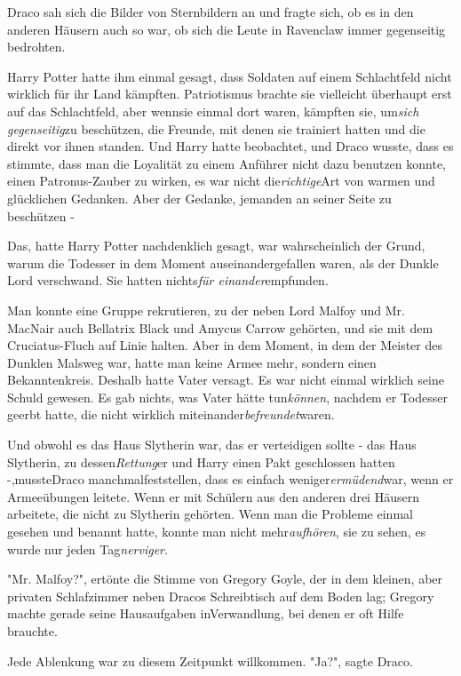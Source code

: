 {Draco sah sich die Bilder von Sternbildern an und fragte sich, ob es in den anderen Häusern auch so war, ob sich die Leute in Ravenclaw immer gegenseitig bedrohten.

Harry Potter hatte ihm einmal gesagt, dass Soldaten auf einem Schlachtfeld nicht wirklich für ihr Land kämpften. Patriotismus brachte sie vielleicht überhaupt erst auf das Schlachtfeld, aber wennsie einmal dort waren, kämpften sie, um\emph{sich gegenseitig}zu beschützen, die Freunde, mit denen sie trainiert hatten und die direkt vor ihnen standen. Und Harry hatte beobachtet, und Draco wusste, dass es stimmte, dass man die Loyalität zu einem Anführer nicht dazu benutzen konnte, einen Patronus-Zauber zu wirken, es war nicht die\emph{richtige}Art von warmen und glücklichen Gedanken. Aber der Gedanke, jemanden an seiner Seite zu beschützen -

Das, hatte Harry Potter nachdenklich gesagt, war wahrscheinlich der Grund, warum die Todesser in dem Moment auseinandergefallen waren, als der Dunkle Lord verschwand. Sie hatten nichts\emph{für einander}empfunden.

Man konnte eine Gruppe rekrutieren, zu der neben Lord Malfoy und Mr. MacNair auch Bellatrix Black und Amycus Carrow gehörten, und sie mit dem Cruciatus-Fluch auf Linie halten. Aber in dem Moment, in dem der Meister des Dunklen Malsweg war, hatte man keine Armee mehr, sondern einen Bekanntenkreis. Deshalb hatte Vater versagt. Es war nicht einmal wirklich seine Schuld gewesen. Es gab nichts, was Vater hätte tun\emph{können}, nachdem er Todesser geerbt hatte, die nicht wirklich miteinander\emph{befreundet}waren.

Und obwohl es das Haus Slytherin war, das er verteidigen sollte - das Haus Slytherin, zu dessen\emph{Rettung}er und Harry einen Pakt geschlossen hatten -,mussteDraco manchmalfeststellen, dass es einfach weniger\emph{ermüdend}war, wenn er Armeeübungen leitete. Wenn er mit Schülern aus den anderen drei Häusern arbeitete, die nicht zu Slytherin gehörten. Wenn man die Probleme einmal gesehen und benannt hatte, konnte man nicht mehr\emph{aufhören}, sie zu sehen, es wurde nur jeden Tag\emph{nerviger}.

"Mr. Malfoy?", ertönte die Stimme von Gregory Goyle, der in dem kleinen, aber privaten Schlafzimmer neben Dracos Schreibtisch auf dem Boden lag; Gregory machte gerade seine Hausaufgaben inVerwandlung, bei denen er oft Hilfe brauchte.

Jede Ablenkung war zu diesem Zeitpunkt willkommen. "Ja?", sagte Draco.

}
